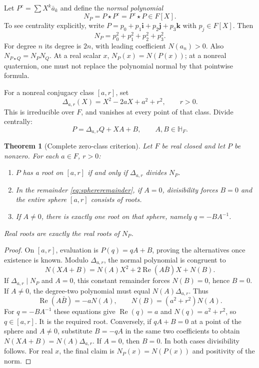 \documentclass[11pt,letterpaper]{article}
\numberwithin{equation}{section}
\newtheorem{theorem}{Theorem}[section]
\theoremstyle{definition}
\theoremstyle{remark}
\newcommand{\HF}{\mathbb H_F}
\newcommand{\ii}{\mathbf i}
\newcommand{\jj}{\mathbf j}
\newcommand{\kk}{\mathbf k}
\newcommand{\Rea}{\operatorname{Re}}
\begin{document}
Let $P^c=\sum X^k\bar a_k$ and define the \emph{normal polynomial}
\begin{equation}\label{eq:normalpoly}
 N_P=P\star P^c=P^c\star P\in F[X].
\end{equation}
To see centrality explicitly, write
$P=p_0+p_1\ii+p_2\jj+p_3\kk$ with $p_j\in F[X]$. Then
\[
 N_P=p_0^2+p_1^2+p_2^2+p_3^2.
\]
For degree $n$ its degree is $2n$, with leading coefficient $N(a_n)>0$.
Also $N_{P\star Q}=N_PN_Q$. At a real scalar $x$, $N_P(x)=N(P(x))$; at a nonreal
quaternion, one must not replace the polynomial normal by that pointwise formula.

For a nonreal conjugacy class $[a,r]$, set
\[
 \Delta_{a,r}(X)=X^2-2aX+a^2+r^2,\qquad r>0.
\]
This is irreducible over $F$, and vanishes at every point of that class. Divide centrally:
\begin{equation}\label{eq:sphereremainder}
 P=\Delta_{a,r}Q+XA+B,\qquad A,B\in\HF.
\end{equation}

\begin{theorem}[Complete zero-class criterion]\label{thm:polynomialzeros}
Let $F$ be real closed and let $P$ be nonzero. For each $a\in F$, $r>0$:
\begin{enumerate}
\item $P$ has a root on $[a,r]$ if and only if $\Delta_{a,r}$ divides $N_P$.
\item In the remainder \eqref{eq:sphereremainder}, if $A=0$, divisibility forces $B=0$ and
      the entire sphere $[a,r]$ consists of roots.
\item If $A\ne0$, there is exactly one root on that sphere, namely $q=-BA^{-1}$.
\end{enumerate}
Real roots are exactly the real roots of $N_P$.
\end{theorem}
\begin{proof}
On $[a,r]$, evaluation is $P(q)=qA+B$, proving the alternatives once existence is known.
Modulo $\Delta_{a,r}$, the normal polynomial is congruent to
\[
 N(XA+B)=N(A)X^2+2\Rea(A\bar B)X+N(B).
\]
If $\Delta_{a,r}\mid N_P$ and $A=0$, this constant remainder forces $N(B)=0$, hence $B=0$.
If $A\ne0$, the degree-two polynomial must equal $N(A)\Delta_{a,r}$. Thus
\[
 \Rea(A\bar B)=-aN(A),\qquad N(B)=(a^2+r^2)N(A).
\]
For $q=-BA^{-1}$ these equations give $\Rea(q)=a$ and $N(q)=a^2+r^2$, so $q\in[a,r]$.
It is the required root. Conversely, if $qA+B=0$ at a point of the sphere and $A\ne0$,
substitute $B=-qA$ in the same two coefficients to obtain
$N(XA+B)=N(A)\Delta_{a,r}$. If $A=0$, then $B=0$. In both cases divisibility follows.
For real $x$, the final claim is $N_P(x)=N(P(x))$ and positivity of the norm.
\end{proof}
\end{document}
